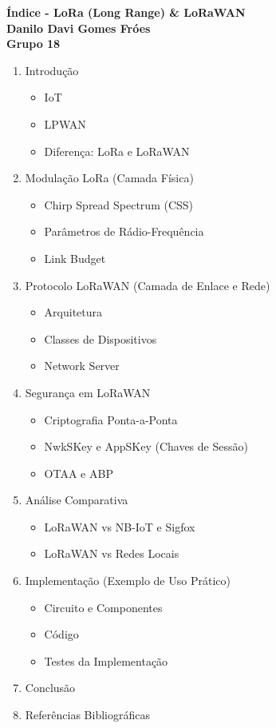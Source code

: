\documentclass[12pt,a4paper]{article}
\begin{document}
\begin{center}
    {\Large \textbf{Índice - LoRa (Long Range) \& LoRaWAN}} \\[0.6cm]
    {\large \textbf{Danilo Davi Gomes Fróes}} \\[0.4cm]
    {\large \textbf{Grupo 18}}
\end{center}

\vspace{1cm}

\begin{enumerate}
    \item Introdução
        \begin{itemize}
            \item IoT
            \item LPWAN
            \item Diferença: LoRa e LoRaWAN
        \end{itemize}

    \item Modulação LoRa (Camada Física)
        \begin{itemize}
            \item Chirp Spread Spectrum (CSS)
            \item Parâmetros de Rádio-Frequência
            \item Link Budget
        \end{itemize}

    \item Protocolo LoRaWAN (Camada de Enlace e Rede)
        \begin{itemize}
            \item Arquitetura
            \item Classes de Dispositivos
            \item Network Server
        \end{itemize}

    \item Segurança em LoRaWAN
        \begin{itemize}
            \item Criptografia Ponta-a-Ponta
            \item NwkSKey e AppSKey (Chaves de Sessão)
            \item OTAA e ABP
        \end{itemize}

    \item Análise Comparativa
        \begin{itemize}
            \item LoRaWAN vs NB-IoT e Sigfox
            \item LoRaWAN vs Redes Locais
        \end{itemize}

    \item Implementação (Exemplo de Uso Prático)
        \begin{itemize}
            \item Circuito e Componentes
            \item Código
            \item Testes da Implementação
        \end{itemize}

    \item Conclusão

    \item Referências Bibliográficas
\end{enumerate}
\end{document}
